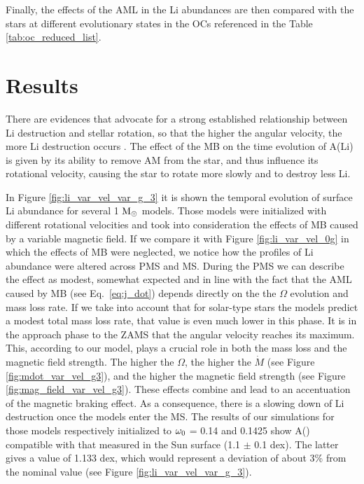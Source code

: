 \documentclass[fleqn,usenatbib]{mnras}
\begin{document}
Finally, the effects of the AML in the Li abundances are then compared with the stars at different evolutionary states in the OCs referenced in the Table \ref{tab:oc_reduced_list}.\par


\section{Results} \label{sec_3}
There are evidences that advocate for a strong established relationship between Li destruction and stellar rotation, so that the higher the angular velocity, the more Li destruction occurs \citep[see][]{Bouvier2018, Caballero2020}. The effect of the MB on the time evolution of A(Li) is given by its ability to remove AM from the star, and thus influence its rotational velocity, causing the star to rotate more slowly and to destroy less Li.\par

In Figure \ref{fig:li_var_vel_var_g_3} it is shown the temporal evolution of surface Li abundance for several 1 $\mathrm{M}_\odot$ models. Those models were initialized with different rotational velocities and took into consideration the effects of MB caused by a variable magnetic field. If we compare it with Figure \ref{fig:li_var_vel_0g} in which the effects of MB were neglected, we notice how the profiles of Li abundance were altered across PMS and MS. During the PMS we can describe the effect as modest, somewhat expected and in line with the fact that the AML caused by MB (see Eq.~\ref{eq:j_dot}) depends directly on the the $\Omega$ evolution and mass loss rate. If we take into account that for solar-type stars the models predict a modest total mass loss rate, that value is even much lower in this phase. It is in the approach phase to the ZAMS that the angular velocity reaches its maximum. This, according to our model, plays a crucial role in both the mass loss and the magnetic field strength. The higher the $\Omega$, the higher the $\Dot{M}$  (see Figure \ref{fig:mdot_var_vel_g3}), and the higher the magnetic field strength (see Figure \ref{fig:mag_field_var_vel_g3}). These effects combine and lead to an accentuation of the magnetic braking effect. As a consequence, there is a slowing down of Li destruction once the models enter the MS. The results of our simulations for those models respectively initialized to $\omega_{\mathrm{0}}$ = 0.14 and 0.1425 show A() compatible with that measured in the Sun surface (1.1 $\pm$ 0.1 dex). The latter gives a value of 1.133 dex, which would represent a deviation of about 3\% from the nominal value (see Figure \ref{fig:li_var_vel_var_g_3}).\par
\end{document}
